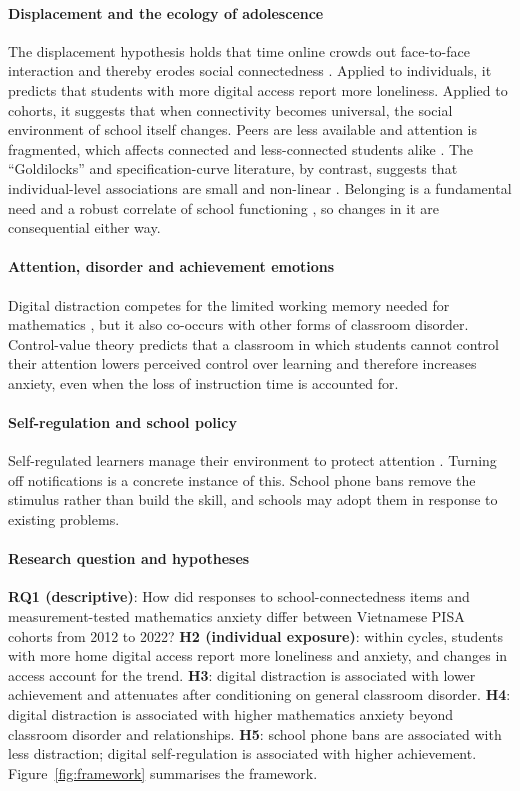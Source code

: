 \documentclass[preprint,12pt,authoryear,nonatbib]{elsarticle}
\let\citep\parencite
\begin{document}
\paragraph{Displacement and the ecology of adolescence} The displacement hypothesis holds that time online crowds out face-to-face interaction and thereby erodes social connectedness \citep{kraut1998}. Applied to individuals, it predicts that students with more digital access report more loneliness. Applied to cohorts, it suggests that when connectivity becomes universal, the social environment of school itself changes. Peers are less available and attention is fragmented, which affects connected and less-connected students alike \citep{twenge2021}. The ``Goldilocks'' and specification-curve literature, by contrast, suggests that individual-level associations are small and non-linear \citep{przybylski2017,orben2019}. Belonging is a fundamental need \citep{baumeister1995} and a robust correlate of school functioning \citep{allen2018}, so changes in it are consequential either way.

\paragraph{Attention, disorder and achievement emotions} Digital distraction competes for the limited working memory needed for mathematics \citep{sweller1988}, but it also co-occurs with other forms of classroom disorder. Control-value theory \citep{pekrun2006} predicts that a classroom in which students cannot control their attention lowers perceived control over learning and therefore increases anxiety, even when the loss of instruction time is accounted for.

\paragraph{Self-regulation and school policy} Self-regulated learners manage their environment to protect attention \citep{zimmerman2002}. Turning off notifications is a concrete instance of this. School phone bans remove the stimulus rather than build the skill, and schools may adopt them in response to existing problems.

\paragraph{Research question and hypotheses} \textbf{RQ1 (descriptive)}: How did responses to school-connectedness items and measurement-tested mathematics anxiety differ between Vietnamese PISA cohorts from 2012 to 2022? \textbf{H2 (individual exposure)}: within cycles, students with more home digital access report more loneliness and anxiety, and changes in access account for the trend. \textbf{H3}: digital distraction is associated with lower achievement and attenuates after conditioning on general classroom disorder. \textbf{H4}: digital distraction is associated with higher mathematics anxiety beyond classroom disorder and relationships. \textbf{H5}: school phone bans are associated with less distraction; digital self-regulation is associated with higher achievement. Figure~\ref{fig:framework} summarises the framework.
\end{document}
